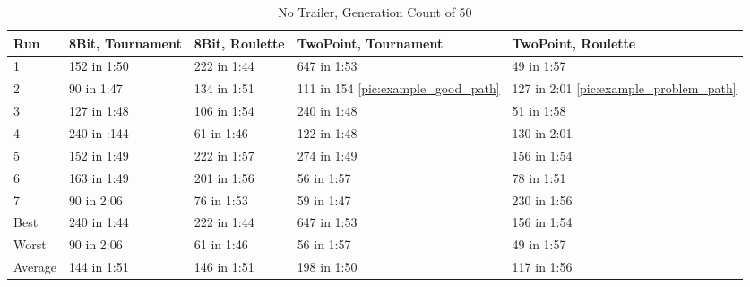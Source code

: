 \begin{table}\caption{No Trailer, Generation Count of 50}
\begin{center}
	\begin{tabular}{| l | l | l | p{3cm} | p{3cm}|}
		\hline
		Run 		& 8Bit, Tournament 	& 8Bit, Roulette 	& TwoPoint, Tournament 	& TwoPoint, Roulette	\\ \hline
		1				&	152 in 1:50				&	222 in 1:44			&	647 in 1:53						&	49 in 1:57					\\ \hline
		2				&	90 in 1:47				&	134 in 1:51			& 111 in 154 \ref{pic:example_good_path}			&	127 in 2:01 \ref{pic:example_problem_path}	\\ \hline		
		3				&	127 in 1:48				&	106 in 1:54			& 240 in 1:48						& 51 in 1:58					\\ \hline
		4				&	240 in :144				&	61 in 1:46			& 122 in 1:48						& 130 in 2:01					\\ \hline
		5				&	152 in 1:49				&	222 in 1:57			&	274 in 1:49						&	156 in 1:54					\\ \hline
		6				&	163 in 1:49				& 201 in 1:56			&	56 in 1:57						& 78 in 1:51					\\ \hline
		7				&	90 in 2:06				&	76 in 1:53			& 59 in 1:47						& 230 in 1:56					\\ \hline
		Best		&	240 in 1:44				&	222 in 1:44			&	647 in 1:53						&	156 in 1:54					\\ \hline
		Worst		&	90 in 2:06				&	61 in 1:46			&	56 in 1:57						& 49 in 1:57					\\ \hline
		Average	&	144 in 1:51				& 146 in 1:51			& 198 in 1:50						&	117 in 1:56					\\ \hline
		\hline
	\end{tabular}
\end{center}
\end{table}


